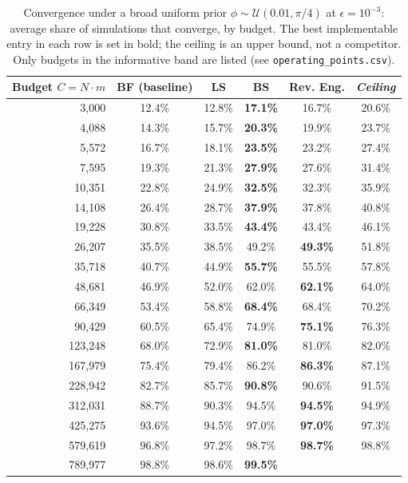 \begin{table}[ht]
\centering
\small
\caption{Convergence under a broad uniform prior $\phi\sim\mathcal{U}(0.01,\pi/4)$ at $\epsilon=10^{-3}$: average share of simulations that converge, by budget. The best implementable entry in each row is set in bold; the ceiling is an upper bound, not a competitor. Only budgets in the informative band are listed (see \texttt{operating\_points.csv}).}
\label{tab:broad-pi4}
\begin{tabular}{rccccc}
\toprule
Budget $C=N\cdot m$
& BF (baseline)
& LS
& BS
& Rev. Eng.
& \textit{Ceiling} \\
\midrule
3{,}000
& 12.4\%
& 12.8\%
& \textbf{17.1\%}
& 16.7\%
& 20.6\% \\
4{,}088
& 14.3\%
& 15.7\%
& \textbf{20.3\%}
& 19.9\%
& 23.7\% \\
5{,}572
& 16.7\%
& 18.1\%
& \textbf{23.5\%}
& 23.2\%
& 27.4\% \\
7{,}595
& 19.3\%
& 21.3\%
& \textbf{27.9\%}
& 27.6\%
& 31.4\% \\
10{,}351
& 22.8\%
& 24.9\%
& \textbf{32.5\%}
& 32.3\%
& 35.9\% \\
14{,}108
& 26.4\%
& 28.7\%
& \textbf{37.9\%}
& 37.8\%
& 40.8\% \\
19{,}228
& 30.8\%
& 33.5\%
& \textbf{43.4\%}
& 43.4\%
& 46.1\% \\
26{,}207
& 35.5\%
& 38.5\%
& 49.2\%
& \textbf{49.3\%}
& 51.8\% \\
35{,}718
& 40.7\%
& 44.9\%
& \textbf{55.7\%}
& 55.5\%
& 57.8\% \\
48{,}681
& 46.9\%
& 52.0\%
& 62.0\%
& \textbf{62.1\%}
& 64.0\% \\
66{,}349
& 53.4\%
& 58.8\%
& \textbf{68.4\%}
& 68.4\%
& 70.2\% \\
90{,}429
& 60.5\%
& 65.4\%
& 74.9\%
& \textbf{75.1\%}
& 76.3\% \\
123{,}248
& 68.0\%
& 72.9\%
& \textbf{81.0\%}
& 81.0\%
& 82.0\% \\
167{,}979
& 75.4\%
& 79.4\%
& 86.2\%
& \textbf{86.3\%}
& 87.1\% \\
228{,}942
& 82.7\%
& 85.7\%
& \textbf{90.8\%}
& 90.6\%
& 91.5\% \\
312{,}031
& 88.7\%
& 90.3\%
& 94.5\%
& \textbf{94.5\%}
& 94.9\% \\
425{,}275
& 93.6\%
& 94.5\%
& 97.0\%
& \textbf{97.0\%}
& 97.3\% \\
579{,}619
& 96.8\%
& 97.2\%
& 98.7\%
& \textbf{98.7\%}
& 98.8\% \\
789{,}977
& 98.8\%
& 98.6\%
& \textbf{99.5\%}

\end{tabular}
\end{table}
